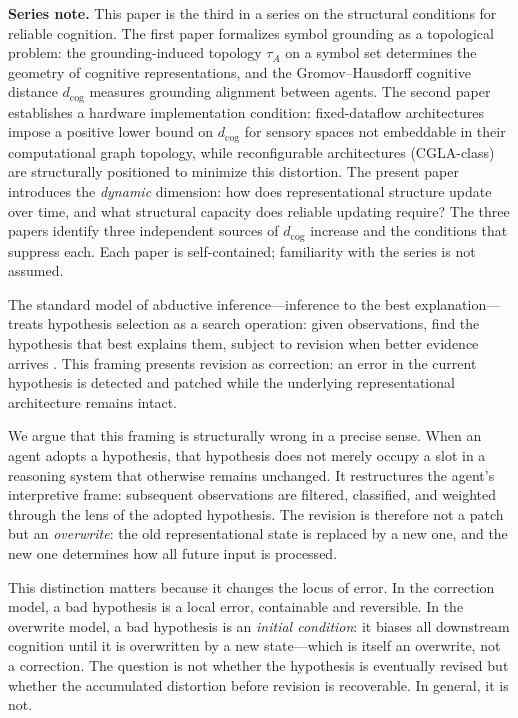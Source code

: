 \documentclass[12pt]{article}
\begin{document}
\noindent\textbf{Series note.}
This paper is the third in a series on the structural conditions for
reliable cognition.
The first paper \cite{minamoto2026topology} formalizes symbol grounding
as a topological problem: the grounding-induced topology $\tau_A$ on a
symbol set determines the geometry of cognitive representations, and
the Gromov--Hausdorff cognitive distance $d_\mathrm{cog}$ measures
grounding alignment between agents.
The second paper \cite{minamoto2026cgla} establishes a hardware
implementation condition: fixed-dataflow architectures impose a positive
lower bound on $d_\mathrm{cog}$ for sensory spaces not embeddable in
their computational graph topology, while reconfigurable architectures
(CGLA-class) are structurally positioned to minimize this distortion.
The present paper introduces the \emph{dynamic} dimension: how does
representational structure update over time, and what structural
capacity does reliable updating require?
The three papers identify three independent sources of $d_\mathrm{cog}$
increase and the conditions that suppress each.
Each paper is self-contained; familiarity with the series is not assumed.

\medskip

The standard model of abductive inference---inference to the best
explanation---treats hypothesis selection as a search operation: given
observations, find the hypothesis that best explains them, subject to
revision when better evidence arrives \cite{peirce1903,harman1965}.
This framing presents revision as correction: an error in the current
hypothesis is detected and patched while the underlying representational
architecture remains intact.

We argue that this framing is structurally wrong in a precise sense.
When an agent adopts a hypothesis, that hypothesis does not merely
occupy a slot in a reasoning system that otherwise remains unchanged.
It restructures the agent's interpretive frame: subsequent observations
are filtered, classified, and weighted through the lens of the adopted
hypothesis.
The revision is therefore not a patch but an \emph{overwrite}: the old
representational state is replaced by a new one, and the new one
determines how all future input is processed.

This distinction matters because it changes the locus of error.
In the correction model, a bad hypothesis is a local error, containable
and reversible.
In the overwrite model, a bad hypothesis is an \emph{initial condition}:
it biases all downstream cognition until it is overwritten by a new
state---which is itself an overwrite, not a correction.
The question is not whether the hypothesis is eventually revised but
whether the accumulated distortion before revision is recoverable.
In general, it is not.
\end{document}
